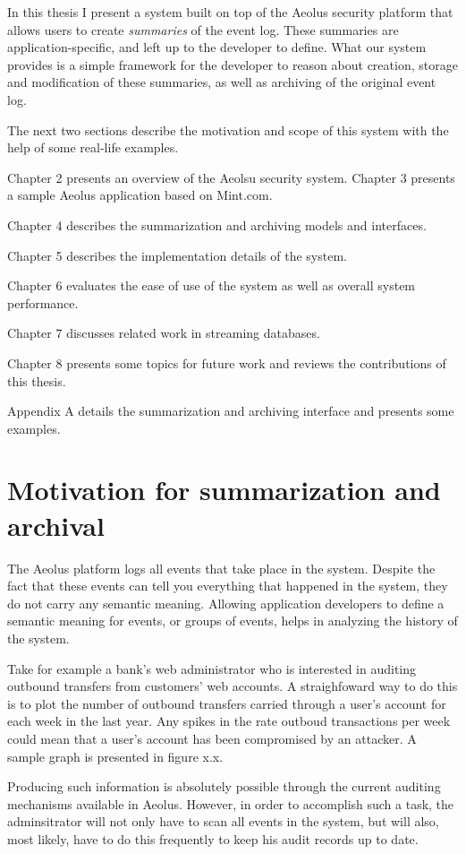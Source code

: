 In this thesis I present a system built on top of the Aeolus security platform that allows users to create \emph{summaries} of the event log. These summaries are application-specific, and left up to the developer to define. What our system provides is a simple framework for the developer to reason about creation, storage and modification of these summaries, as well as archiving of the original event log.

The next two sections describe the motivation and scope of this system with the help of some real-life examples.

Chapter 2 presents an overview of the Aeolsu security system. Chapter 3 presents a sample Aeolus application based on Mint.com.

Chapter 4 describes the summarization and archiving models and interfaces.

Chapter 5 describes the implementation details of the system.

Chapter 6 evaluates the ease of use of the system as well as overall system performance.

Chapter 7 discusses related work in streaming databases.

Chapter 8 presents some topics for future work and reviews the contributions of this thesis.

Appendix A details the summarization and archiving interface and presents some examples.


\section{Motivation for summarization and archival}

The Aeolus platform logs all events that take place in the system. Despite the fact that these events can tell you everything that happened in the system, they do not carry any semantic meaning. Allowing application developers to define a semantic meaning for events, or groups of events, helps in analyzing the history of the system.

Take for example a bank's web administrator who is interested in auditing outbound transfers from customers' web accounts. A straighfoward way to do this is to plot the number of outbound transfers carried through a user's account for each week in the last year. Any spikes in the rate outboud transactions per week could mean that a user's account has been compromised by an attacker. A sample graph is presented in figure x.x.

Producing such information is absolutely possible through the current auditing mechanisms available in Aeolus. However, in order to accomplish such a task, the adminsitrator will not only have to scan all events in the system, but will also, most likely, have to do this frequently to keep his audit records up to date.

